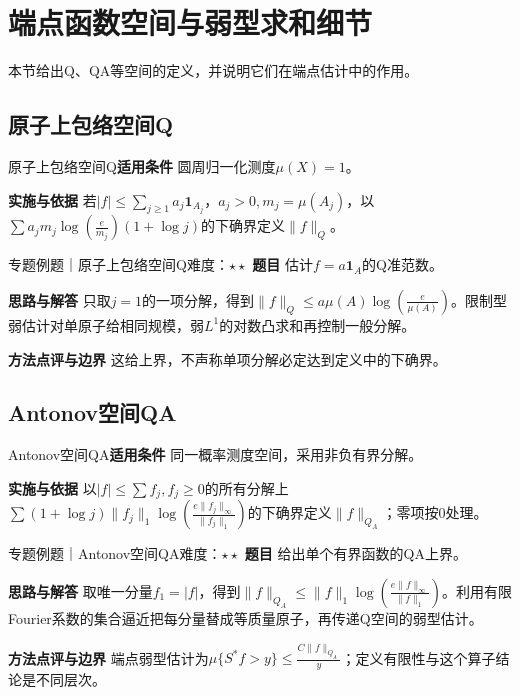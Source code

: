 \section{端点函数空间与弱型求和细节}\label{mat:endpoint_spaces}
\begin{examtip}本节给出Q、QA等空间的定义，并说明它们在端点估计中的作用。\end{examtip}
\subsection{原子上包络空间Q}\label{mat:endpoint_spaces:qspace}
\begin{method}{原子上包络空间Q}\textbf{适用条件} 圆周归一化测度$\mu(X)=1$。\par\textbf{实施与依据} 若$|f|\le\sum_{j\ge1}a_j\mathbf1_{A_j}$，$a_j>0,m_j=\mu(A_j)$，以$\sum a_jm_j\log(\frac{e}{m_j})(1+\log j)$的下确界定义$\|f\|_Q$。\end{method}
\begin{example}{专题例题｜原子上包络空间Q}{难度：$\star\star$}
\textbf{题目} 估计$f=a\mathbf1_A$的Q准范数。\par\textbf{思路与解答} 只取$j=1$的一项分解，得到$\|f\|_Q\le a\mu(A)\log(\frac{e}{\mu(A)})$。限制型弱估计对单原子给相同规模，弱$L^1$的对数凸求和再控制一般分解。\par\textbf{方法点评与边界} 这给上界，不声称单项分解必定达到定义中的下确界。
\end{example}
\subsection{Antonov空间QA}\label{mat:endpoint_spaces:qaspace}
\begin{method}{Antonov空间QA}\textbf{适用条件} 同一概率测度空间，采用非负有界分解。\par\textbf{实施与依据} 以$|f|\le\sum f_j,f_j\ge0$的所有分解上$\sum(1+\log j)\|f_j\|_1\log(\frac{e\|f_j\|_\infty}{\|f_j\|_1})$的下确界定义$\|f\|_{Q_A}$；零项按0处理。\end{method}
\begin{example}{专题例题｜Antonov空间QA}{难度：$\star\star$}
\textbf{题目} 给出单个有界函数的QA上界。\par\textbf{思路与解答} 取唯一分量$f_1=|f|$，得到$\|f\|_{Q_A}\le\|f\|_1\log(\frac{e\|f\|_\infty}{\|f\|_1})$。利用有限Fourier系数的集合逼近把每分量替成等质量原子，再传递Q空间的弱型估计。\par\textbf{方法点评与边界} 端点弱型估计为$\mu\{S^*f>y\}\le \frac{C\|f\|_{Q_A}}{y}$；定义有限性与这个算子结论是不同层次。
\end{example}
